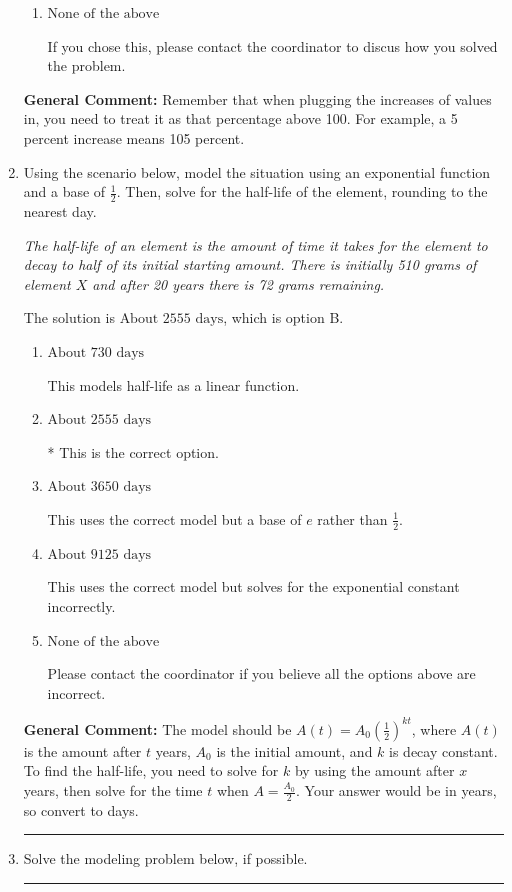 \documentclass{extbook}[14pt]
\newcommand{\litem}[1]{\item #1

\rule{\textwidth}{0.4pt}}
\begin{document}
\begin{enumerate}
{\begin{enumerate}[label=\Alph*.]
This corresponds to not solving for the increase properly.
\item \( \text{None of the above} \)

If you chose this, please contact the coordinator to discus how you solved the problem.
\end{enumerate}

\textbf{General Comment:} Remember that when plugging the increases of values in, you need to treat it as that percentage above 100. For example, a 5 percent increase means 105 percent.
}
\litem{
Using the scenario below, model the situation using an exponential function and a base of $\frac{1}{2}$. Then, solve for the half-life of the element, rounding to the nearest day.

\begin{center}
    \textit{ The half-life of an element is the amount of time it takes for the element to decay to half of its initial starting amount. There is initially 510 grams of element $X$ and after 20 years there is 72 grams remaining. }
\end{center}


The solution is \( \text{About } 2555 \text{ days} \), which is option B.\begin{enumerate}[label=\Alph*.]
\item \( \text{About } 730 \text{ days} \)

This models half-life as a linear function.
\item \( \text{About } 2555 \text{ days} \)

* This is the correct option.
\item \( \text{About } 3650 \text{ days} \)

This uses the correct model but a base of $e$ rather than $\frac{1}{2}$.
\item \( \text{About } 9125 \text{ days} \)

This uses the correct model but solves for the exponential constant incorrectly.
\item \( \text{None of the above} \)

Please contact the coordinator if you believe all the options above are incorrect.
\end{enumerate}

\textbf{General Comment:} The model should be $A(t) = A_0 (\frac{1}{2})^{kt}$, where $A(t)$ is the amount after $t$ years, $A_0$ is the initial amount, and $k$ is decay constant. To find the half-life, you need to solve for $k$ by using the amount after $x$ years, then solve for the time $t$ when $A = \frac{A_0}{2}$. Your answer would be in years, so convert to days.
}
\litem{
Solve the modeling problem below, if possible.

}
\end{enumerate}
\end{document}
